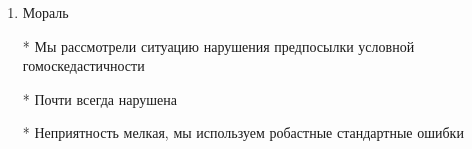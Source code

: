 \documentclass[12pt,a4paper]{article}
\begin{document}
{\begin{enumerate}
Задача про среднюю оценку по математике в классе
Если бы мы знали как устроена гетероскедастичность...


\item Мораль

* Мы рассмотрели ситуацию нарушения предпосылки условной гомоскедастичности

* Почти всегда нарушена
 
* Неприятность мелкая, мы используем робастные стандартные ошибки







 

 




\end{enumerate}





} %
\end{document}
